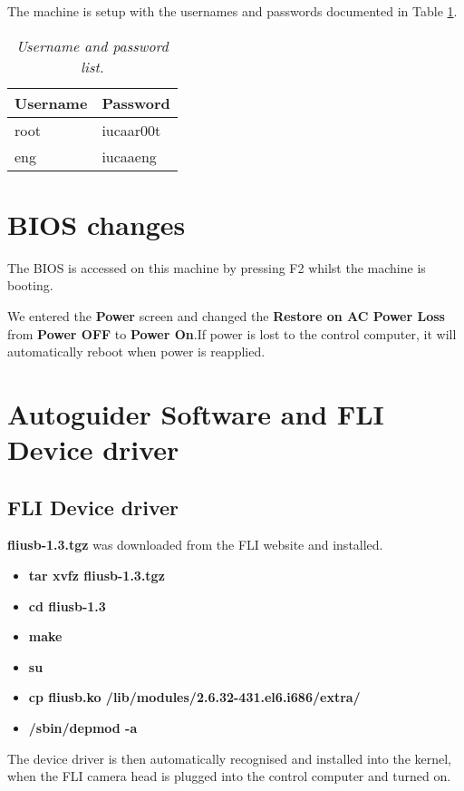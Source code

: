 \documentclass[10pt,a4paper]{article}
\begin{document}
The machine is setup with the usernames and passwords documented in Table \ref{tab:usernamespasswords}.

\begin{table}[!h]
\begin{center}
\begin{tabular}{|l|l|}
\hline
{\bf Username} & {\bf Password} \\ \hline
root & iucaar00t \\ \hline
eng & iucaaeng \\ \hline
\end{tabular}
\end{center}
\caption{\em Username and password list.}
\label{tab:usernamespasswords}
\end{table}

\section{BIOS changes}

The BIOS is accessed on this machine by pressing F2 whilst the machine is booting.

We entered the {\bf Power} screen and changed the {\bf Restore on AC Power Loss} from {\bf Power OFF} to {\bf Power On}.If power is lost to the control computer, it will automatically reboot when power is reapplied.

\section{Autoguider Software and FLI Device driver}

\subsection{FLI Device driver}

{\bf fliusb-1.3.tgz} was downloaded from the FLI website and installed.

\begin{itemize}
\item {\bf tar xvfz fliusb-1.3.tgz}
\item {\bf cd fliusb-1.3}
\item {\bf make}
\item {\bf su}
\item {\bf cp fliusb.ko /lib/modules/2.6.32-431.el6.i686/extra/}
\item {\bf /sbin/depmod -a}
\end{itemize}

The device driver is then automatically recognised and installed into the kernel, when the FLI camera head is plugged into the control computer and turned on.
\end{document}
